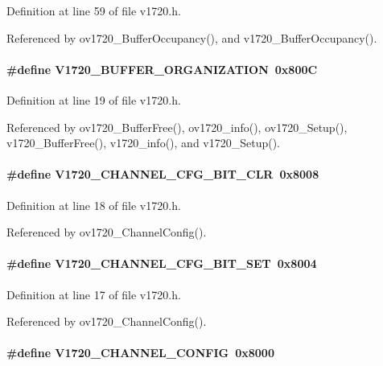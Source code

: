 Definition at line 59 of file v1720.h.

Referenced by ov1720\_\-BufferOccupancy(), and v1720\_\-BufferOccupancy().
\paragraph[{V1720\_\-BUFFER\_\-ORGANIZATION}]{\setlength{\rightskip}{0pt plus 5cm}\#define V1720\_\-BUFFER\_\-ORGANIZATION~0x800C}\hfill\label{v1720_8h_ad8d3832b8519ba9e866cbc8fd7645b3f}


Definition at line 19 of file v1720.h.

Referenced by ov1720\_\-BufferFree(), ov1720\_\-info(), ov1720\_\-Setup(), v1720\_\-BufferFree(), v1720\_\-info(), and v1720\_\-Setup().
\paragraph[{V1720\_\-CHANNEL\_\-CFG\_\-BIT\_\-CLR}]{\setlength{\rightskip}{0pt plus 5cm}\#define V1720\_\-CHANNEL\_\-CFG\_\-BIT\_\-CLR~0x8008}\hfill\label{v1720_8h_a8f4f5fd50faa74cae79ac1095a22bc3b}


Definition at line 18 of file v1720.h.

Referenced by ov1720\_\-ChannelConfig().
\paragraph[{V1720\_\-CHANNEL\_\-CFG\_\-BIT\_\-SET}]{\setlength{\rightskip}{0pt plus 5cm}\#define V1720\_\-CHANNEL\_\-CFG\_\-BIT\_\-SET~0x8004}\hfill\label{v1720_8h_ae9c047254a6c5ba2e7e79672a18dab07}


Definition at line 17 of file v1720.h.

Referenced by ov1720\_\-ChannelConfig().
\paragraph[{V1720\_\-CHANNEL\_\-CONFIG}]{\setlength{\rightskip}{0pt plus 5cm}\#define V1720\_\-CHANNEL\_\-CONFIG~0x8000}\hfill\label{v1720_8h_a9e1afab5b60e8d359cb2bd3b0d137e8b}


